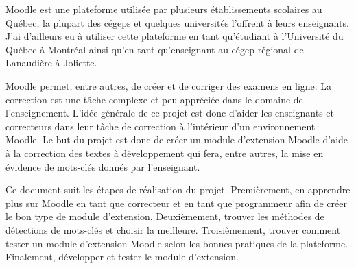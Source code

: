 \begin{introduction}

Moodle est une plateforme utilisée par plusieurs établissements scolaires au Québec, la plupart des cégeps et quelques universités l'offrent à leurs enseignants.
J'ai d'ailleurs eu à utiliser cette plateforme en tant qu'étudiant à l'Université du Québec à Montréal ainsi qu'en tant qu'enseignant au cégep régional de Lanaudière à Joliette.

Moodle permet, entre autres, de créer et de corriger des examens en ligne.
La correction est une tâche complexe et peu appréciée dans le domaine de l'enseignement.
L'idée générale de ce projet est donc d'aider les enseignants et correcteurs dans leur tâche de correction à l'intérieur d'un environnement Moodle.
Le but du projet est donc de créer un module d'extension Moodle d'aide à la correction des textes à développement qui fera, entre autres, la mise en évidence de mots-clés donnés par l'enseignant.

Ce document suit les étapes de réalisation du projet.
Premièrement, en apprendre plus sur Moodle en tant que correcteur et en tant que programmeur afin de créer le bon type de module d'extension.
Deuxièmement, trouver les méthodes de détections de mots-clés et choisir la meilleure.
Troisièmement, trouver comment tester un module d'extension Moodle selon les bonnes pratiques de la plateforme.
Finalement, développer et tester le module d'extension.

\end{introduction}